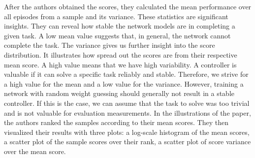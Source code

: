 After the authors obtained the scores, they calculated the mean performance over all episodes from a sample and its variance. These statistics are significant insights. They can reveal how stable the network models are in completing a given task. A low mean value suggests that, in general, the network cannot complete the task. The variance gives us further insight into the score distribution. It illustrates how spread out the scores are from their respective mean score. A high value means that we have high variability. A controller is valuable if it can solve a specific task reliably and stable. Therefore, we strive for a high value for the mean and a low value for the variance. However, training a network with random weight guessing should generally not result in a stable controller. If this is the case, we can assume that the task to solve was too trivial and is not valuable for evaluation measurements. In the illustrations of the paper, the authors ranked the samples according to their mean scores. They then visualized their results with three plots: a log-scale histogram of the mean scores, a scatter plot of the sample scores over their rank, a scatter plot of score variance over the mean score.

